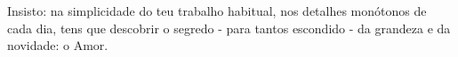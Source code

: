 %

\begin{openingquote}
    Insisto: na simplicidade do teu trabalho habitual, nos detalhes monótonos de cada dia, tens que descobrir o segredo - para tantos escondido - da grandeza e da novidade: o Amor. \cite[n. 489]{escriva2016sulco}
\end{openingquote}

\lipsum[1-3]